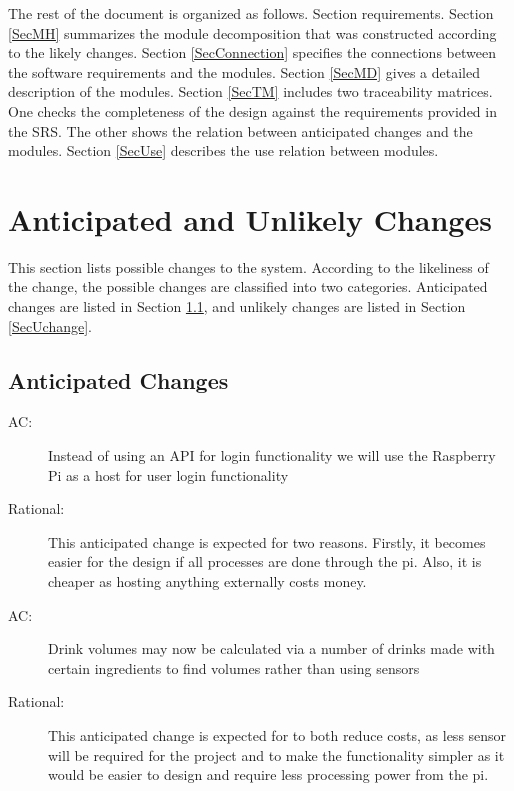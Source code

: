 \documentclass[12pt, titlepage]{article}
\newcounter{acnum}
\newcommand{\actheacnum}{AC\theacnum}
\begin{document}
The rest of the document is organized as follows. Section
requirements. Section \ref{SecMH} summarizes the module decomposition that
was constructed according to the likely changes. Section \ref{SecConnection}
specifies the connections between the software requirements and the
modules. Section \ref{SecMD} gives a detailed description of the
modules. Section \ref{SecTM} includes two traceability matrices. One checks
the completeness of the design against the requirements provided in the SRS. The
other shows the relation between anticipated changes and the modules. Section
\ref{SecUse} describes the use relation between modules.

\section{Anticipated and Unlikely Changes} \label{SecChange}

This section lists possible changes to the system. According to the likeliness
of the change, the possible changes are classified into two
categories. Anticipated changes are listed in Section \ref{SecAchange}, and
unlikely changes are listed in Section \ref{SecUchange}.

\subsection{Anticipated Changes} \label{SecAchange}

\begin{description}
\item[ \actheacnum \label{acHardware}:] Instead of using an API for login functionality we will use the Raspberry Pi as a host for user login functionality
\item [Rational:] This anticipated change is expected for two reasons. Firstly, it becomes easier for the design if all processes are done through the pi. Also, it is cheaper as hosting anything externally costs money.
\item[ \actheacnum \label{acInput}:] Drink volumes may now be calculated via a number of drinks made with certain ingredients to find volumes rather than using sensors
\item [Rational:] This anticipated change is expected for to both reduce costs, as less sensor will be required for the project and to make the functionality simpler as it would be easier to design and require less processing power from the pi.
\end{description}
\end{document}

